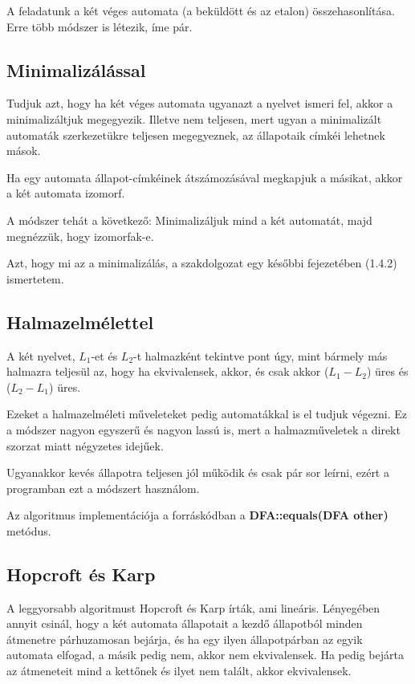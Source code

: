 \documentclass[12pt]{report}
\theoremstyle{definition}
\begin{document}
A feladatunk a két véges automata (a beküldött és az etalon) összehasonlítása. Erre több módszer is létezik, íme pár.

\subsection*{Minimalizálással}
Tudjuk azt, hogy ha két véges automata ugyanazt a nyelvet ismeri fel, akkor a minimalizáltjuk megegyezik. Illetve nem teljesen, mert ugyan a minimalizált automaták szerkezetükre teljesen megegyeznek, az állapotaik címkéi lehetnek mások.

Ha egy automata állapot-címkéinek átszámozásával megkapjuk a másikat, akkor a két automata izomorf.

A módszer tehát a következő: Minimalizáljuk mind a két automatát, majd megnézzük, hogy izomorfak-e.

Azt, hogy mi az a minimalizálás, a szakdolgozat egy későbbi fejezetében (1.4.2) ismertetem.

\subsection*{Halmazelmélettel}
A két nyelvet, $L_1$-et és $L_2$-t halmazként tekintve pont úgy, mint bármely más halmazra teljesül az, hogy ha ekvivalensek, akkor, és csak akkor ($L_1-L_2$) üres és ($L_2-L_1$) üres.

Ezeket a halmazelméleti műveleteket pedig automatákkal is el tudjuk végezni. Ez a módszer nagyon egyszerű és nagyon lassú is, mert a halmazműveletek a direkt szorzat miatt négyzetes idejűek.

Ugyanakkor kevés állapotra teljesen jól működik és csak pár sor leírni, ezért a programban ezt a módszert használom.

Az algoritmus implementációja a forráskódban a \textbf{DFA::equals(DFA other)} metódus.

\subsection*{Hopcroft és Karp}
A leggyorsabb algoritmust Hopcroft és Karp\cite{Hopcroft and Karp} írták, ami lineáris. Lényegében annyit csinál, hogy a két automata állapotait a kezdő állapotból minden átmenetre párhuzamosan bejárja, és ha egy ilyen állapotpárban az egyik automata elfogad, a másik pedig nem, akkor nem ekvivalensek. Ha pedig bejárta az átmeneteit mind a kettőnek és ilyet nem talált, akkor ekvivalensek.
\end{document}
